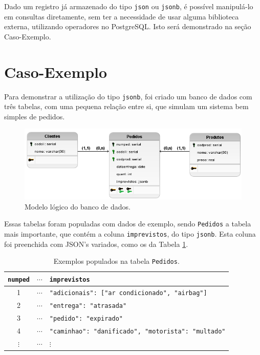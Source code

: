 \documentclass[a4paper, 12pt]{article}
\begin{document}
  Dado um registro já armazenado do tipo \verb|json|
  ou \verb|jsonb|, é possível manipulá-lo em consultas
  diretamente, sem ter a necessidade de usar alguma
  biblioteca externa, utilizando operadores no PostgreSQL.
  Isto será demonstrado na seção Caso-Exemplo.

  \section{Caso-Exemplo}
  
  Para demonstrar a utilização do tipo \verb|jsonb|,
  foi criado um banco de dados com três tabelas,
  com uma pequena relação entre si, que simulam
  um sistema bem simples de pedidos.
  
  \begin{figure}[h!]
    \centering
    \includegraphics[width=0.8\linewidth]{example-case.png}
    \caption{Modelo lógico do banco de dados.}
    \label{fig:my_label}
  \end{figure}
  
  Essas tabelas foram populadas com dados de exemplo,
  sendo \verb|Pedidos| a tabela mais importante, 
  que contém a coluna \verb|imprevistos|,
  do tipo \verb|jsonb|. Esta coluna foi preenchida
  com JSON's variados, como os da Tabela \ref{tab:ex}.
  
  \begin{table}[h!]
    \centering
    \begin{tabular}{ccl}
      \toprule
      \texttt{numped} & $\cdots$ & \texttt{imprevistos} \\
      \midrule
      1 & $\cdots$ & \texttt{{"adicionais": ["ar condicionado", "airbag"]}} \\
      2 & $\cdots$ & \texttt{{"entrega": "atrasada"}} \\
      3 & $\cdots$ & \texttt{{"pedido": "expirado"}} \\
      4 & $\cdots$ & \texttt{{"caminhao": "danificado", "motorista": "multado"}} \\
      $\vdots$ & $\cdots$ & \hspace{0.2cm} $\vdots$ \\
      \bottomrule
    \end{tabular}
    \caption{Exemplos populados na tabela \texttt{Pedidos}.}
    \label{tab:ex}
  \end{table}
  
\end{document}
